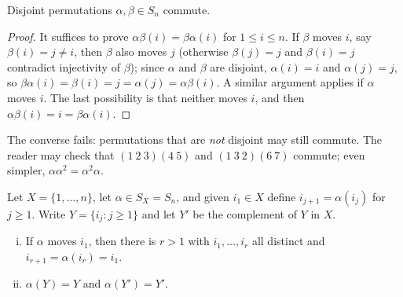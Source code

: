 \begin{lemma}\label{lem:disjoint-commute}
	Disjoint permutations \(\alpha, \beta \in S_n\) commute.
\end{lemma}

\begin{proof}
	It suffices to prove \(\alpha\beta(i) = \beta\alpha(i)\) for \(1 \leq i \leq n\).
	If \(\beta\) moves \(i\), say \(\beta(i) = j \neq i\), then \(\beta\) also moves \(j\)
	(otherwise \(\beta(j) = j\) and \(\beta(i) = j\) contradict injectivity of \(\beta\));
	since \(\alpha\) and \(\beta\) are disjoint, \(\alpha(i) = i\) and \(\alpha(j) = j\),
	so \(\beta\alpha(i) = \beta(i) = j = \alpha(j) = \alpha\beta(i)\). A similar argument
	applies if \(\alpha\) moves \(i\). The last possibility is that neither moves \(i\),
	and then \(\alpha\beta(i) = i = \beta\alpha(i)\).
\end{proof}

\begin{remark}
	The converse fails: permutations that are \emph{not} disjoint may still commute. The
	reader may check that \((1\ 2\ 3)(4\ 5)\) and \((1\ 3\ 2)(6\ 7)\) commute; even simpler,
	\(\alpha\alpha^2 = \alpha^2\alpha\).
\end{remark}

\begin{lemma}\label{lem:orbit}
	Let \(X = \{1, \dots, n\}\), let \(\alpha \in S_X = S_n\), and given \(i_1 \in X\)
	define \(i_{j+1} = \alpha(i_j)\) for \(j \geq 1\). Write \(Y = \{i_j : j \geq 1\}\) and
	let \(Y'\) be the complement of \(Y\) in \(X\).
	\begin{enumerate}[(i)]
		\item If \(\alpha\) moves \(i_1\), then there is \(r > 1\) with
		      \(i_1, \dots, i_r\) all distinct and \(i_{r+1} = \alpha(i_r) = i_1\).
		\item \(\alpha(Y) = Y\) and \(\alpha(Y') = Y'\).
	\end{enumerate}
\end{lemma}


